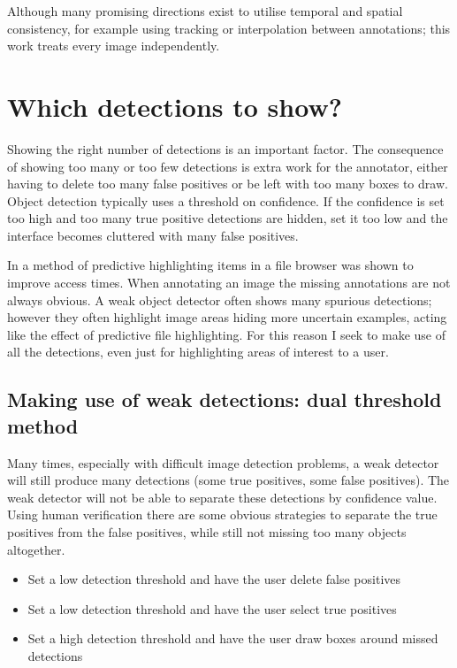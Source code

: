 Although many promising directions exist to utilise temporal and spatial consistency, for example using tracking or interpolation between annotations; this work treats every image independently. 


\section {Which detections to show?}
\label{sec:thresholding}

Showing the right number of detections is an important factor. The consequence of showing too many or too few detections is extra work for the annotator, either having to delete too many false positives or be left with too many boxes to draw. Object detection typically uses a threshold on confidence. If the confidence is set too high and too many true positive detections are hidden, set it too low and the interface becomes cluttered with many false positives.

In \cite{Fitchett2013} a method of predictive highlighting items in a file browser was shown to improve access times. When annotating an image the missing annotations are not always obvious. A weak object detector often shows many spurious detections; however they often highlight image areas hiding more uncertain examples, acting like the effect of predictive file highlighting. For this reason I seek to make use of all the detections, even just for highlighting areas of interest to a user. 

\subsection{Making use of weak detections: dual threshold method}

 Many times, especially with difficult image detection problems, a weak detector will still produce many detections (some true positives, some false positives). The weak detector will not be able to separate these detections by confidence value. Using human verification there are some obvious strategies to separate the true positives from the false positives, while still not missing too many objects altogether. 

\begin{itemize}
    \item Set a low detection threshold and have the user delete false positives
    \item Set a low detection threshold and have the user select true positives
    \item Set a high detection threshold and have the user draw boxes around missed detections
\end{itemize}

